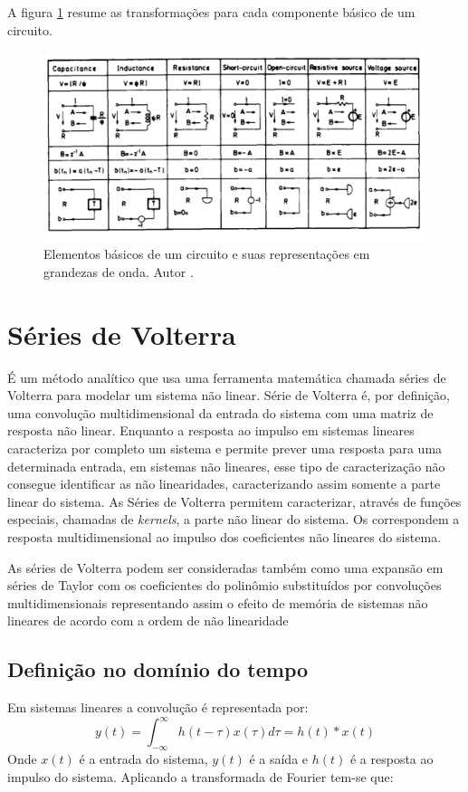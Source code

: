 A figura \ref{fig:componentesemwdf} resume as transformações para cada componente básico de um circuito.
\begin{figure}[!htb]
	\centering
	\includegraphics[width=0.7\linewidth]{figuras/ComponentesemWDF}
	\caption{Elementos básicos de um circuito e suas representações em grandezas de onda. Autor \cite{fettweis1986wave}.}
	\label{fig:componentesemwdf}
\end{figure}




\section*{Séries de Volterra}{\label{Volterra}}
É um método analítico que usa uma ferramenta matemática chamada séries de Volterra para modelar um sistema não linear. Série de Volterra é, por definição, uma convolução multidimensional da entrada do sistema com uma matriz de resposta não linear. Enquanto a resposta ao impulso em sistemas lineares caracteriza por completo um sistema e permite prever uma resposta para uma determinada entrada, em sistemas não lineares, esse tipo de caracterização não consegue identificar as não linearidades, caracterizando assim somente a parte linear do sistema. As Séries de Volterra permitem caracterizar, através de funções especiais, chamadas de \textit{kernels}, a parte não linear do sistema. Os  correspondem a resposta multidimensional ao impulso dos coeficientes não lineares do sistema. \cite{pakarinen2009review}

As séries de Volterra podem ser consideradas também como uma expansão em séries de Taylor com os coeficientes do polinômio substituídos por convoluções multidimensionais representando assim o efeito de memória de sistemas não lineares de acordo com a ordem de não linearidade \cite{pakarinen2009review}



\subsection*{Definição no domínio do tempo}
Em sistemas lineares a convolução é representada por:
\begin{equation}
y(t) = \int_{-\infty}^{\infty} h(t-\tau)x(\tau)d\tau = h(t)*x(t)
\label{Integral de convolução}
\end{equation}
Onde $x(t)$ é a entrada do sistema, $y(t)$ é a saída e $h(t)$ é a resposta ao impulso do sistema. Aplicando a transformada de Fourier tem-se que:

